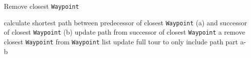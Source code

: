 \begin{breakablealgorithm}
	\caption{Remove closest \texttt{Waypoint}}
	\label{alg:SAGenerateNeigborhoodRemove}
	\begin{algorithmic}[1]
		\STATE calculate shortest path between predecessor of closest \texttt{Waypoint} (a) and successor of closest \texttt{Waypoint} (b)
		\STATE update path from successor of closest \texttt{Waypoint} a
		\STATE remove closest \texttt{Waypoint} from \texttt{Waypoint} list
		\STATE update full tour to only include path part a-b
	\end{algorithmic}
\end{breakablealgorithm}

